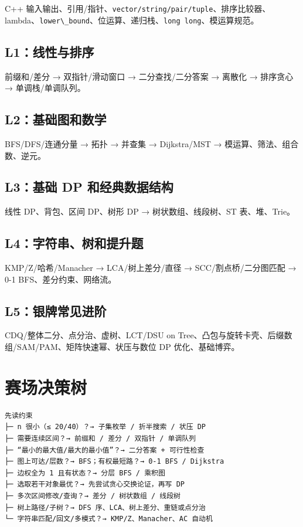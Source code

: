 C++ 输入输出、引用/指针、\passthrough{\lstinline!vector/string/pair/tuple!}、排序比较器、lambda、\passthrough{\lstinline!lower\_bound!}、位运算、递归栈、\passthrough{\lstinline!long long!}、模运算规范。

\subsection{L1：线性与排序}\label{l1ux7ebfux6027ux4e0eux6392ux5e8f}

前缀和/差分 → 双指针/滑动窗口 → 二分查找/二分答案 → 离散化 → 排序贪心 → 单调栈/单调队列。

\subsection{L2：基础图和数学}\label{l2ux57faux7840ux56feux548cux6570ux5b66}

BFS/DFS/连通分量 → 拓扑 → 并查集 → Dijkstra/MST → 模运算、筛法、组合数、逆元。

\subsection{L3：基础 DP 和经典数据结构}\label{l3ux57faux7840-dp-ux548cux7ecfux5178ux6570ux636eux7ed3ux6784}

线性 DP、背包、区间 DP、树形 DP → 树状数组、线段树、ST 表、堆、Trie。

\subsection{L4：字符串、树和提升题}\label{l4ux5b57ux7b26ux4e32ux6811ux548cux63d0ux5347ux9898}

KMP/Z/哈希/Manacher → LCA/树上差分/直径 → SCC/割点桥/二分图匹配 → 0-1 BFS、差分约束、网络流。

\subsection{L5：银牌常见进阶}\label{l5ux94f6ux724cux5e38ux89c1ux8fdbux9636}

CDQ/整体二分、点分治、虚树、LCT/DSU on Tree、凸包与旋转卡壳、后缀数组/SAM/PAM、矩阵快速幂、状压与数位 DP 优化、基础博弈。

\section{赛场决策树}\label{ux8d5bux573aux51b3ux7b56ux6811}

\begin{lstlisting}
先读约束
├─ n 很小（≤ 20/40）？→ 子集枚举 / 折半搜索 / 状压 DP
├─ 需要连续区间？→ 前缀和 / 差分 / 双指针 / 单调队列
├─ “最小的最大值/最大的最小值”？→ 二分答案 + 可行性检查
├─ 图上可达/层数？→ BFS；有权最短路？→ 0-1 BFS / Dijkstra
├─ 边权全为 1 且有状态？→ 分层 BFS / 乘积图
├─ 选取若干对象最优？→ 先尝试贪心交换论证，再写 DP
├─ 多次区间修改/查询？→ 差分 / 树状数组 / 线段树
├─ 树上路径/子树？→ DFS 序、LCA、树上差分、重链或点分治
└─ 字符串匹配/回文/多模式？→ KMP/Z、Manacher、AC 自动机
\end{lstlisting}

